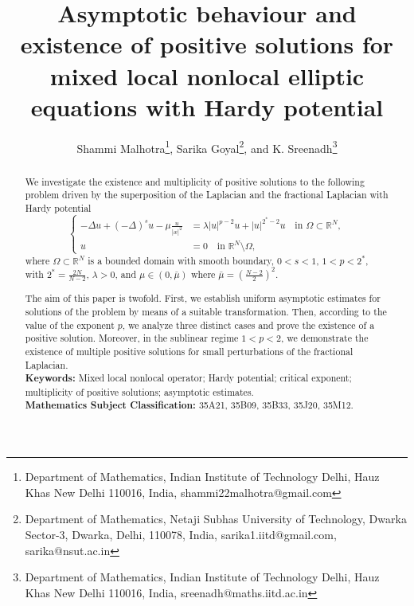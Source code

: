\documentclass[11pt]{article}
\title{Asymptotic behaviour and existence of positive solutions for mixed local nonlocal elliptic equations with Hardy potential}
\author{Shammi Malhotra\footnote{Department of Mathematics, Indian Institute of Technology Delhi, Hauz Khas New Delhi 110016,  India, shammi22malhotra@gmail.com}, Sarika Goyal\footnote{Department of Mathematics, Netaji Subhas University of Technology,
		Dwarka Sector-3, Dwarka, Delhi, 110078, India, sarika1.iitd@gmail.com, sarika@nsut.ac.in},  and K. Sreenadh\footnote{Department of Mathematics, Indian Institute of Technology Delhi, Hauz Khas New Delhi 110016,  India, sreenadh@maths.iitd.ac.in}}
\date{}
\newcommand{\noi} {\noindent}
\begin{document}
\maketitle

\begin{abstract}
\noindent We investigate the existence and multiplicity of positive solutions to the following problem driven by the superposition of the Laplacian and the fractional Laplacian with Hardy potential
\begin{equation*}
\left\{
\begin{aligned}
    -\Delta u + (-\Delta)^s u - \mu \frac{u}{|x|^2} &= \lambda |u|^{p-2} u + |u|^{2^*-2} u \quad \text{in } \Omega \subset \mathbb{R}^N, \\
    u &= 0 \quad \text{in } \mathbb{R}^N \setminus \Omega,
\end{aligned}
\right.
\end{equation*}
where \( \Omega \subset \mathbb{R}^N \) is a bounded domain with smooth boundary, \( 0 < s < 1 \), \( 1 < p < 2^* \), with \( 2^* = \frac{2N}{N-2} \), \( \lambda > 0 \), and \( \mu \in (0, \bar{\mu}) \) where $\bar \mu = \left( \frac{N-2}{2} \right)^2$. 

\noindent The aim of this paper is twofold. First, we establish uniform asymptotic estimates for solutions of the problem by means of a suitable transformation. Then, according to the value of the exponent \(p\), we analyze three distinct cases and prove the existence of a positive solution. Moreover, in the sublinear regime \(1 < p < 2\), we demonstrate the existence of multiple positive solutions for small perturbations of the fractional Laplacian.\\


\medskip
\noi\textbf{Keywords:} Mixed local nonlocal operator; Hardy potential; critical exponent; multiplicity of positive solutions; asymptotic estimates.  \\
\medskip
\noi\textbf{Mathematics Subject Classification:}  35A21, 35B09, 35B33, 35J20, 35M12.
\end{abstract}
\end{document}
